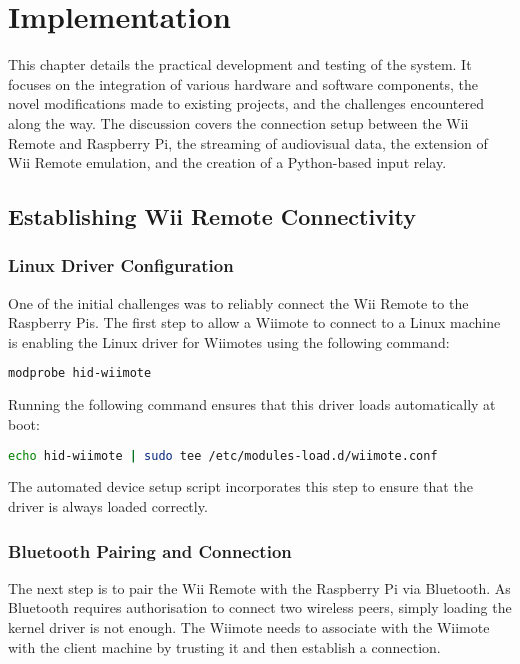 \chapter{Implementation}
\label{chapter:implemntation}

This chapter details the practical development and testing of the system. It
focuses on the integration of various hardware and software components, the
novel modifications made to existing projects, and the challenges encountered
along the way. The discussion covers the connection setup between the Wii Remote
and Raspberry Pi, the streaming of audiovisual data, the extension of Wii Remote
emulation, and the creation of a Python-based input relay.

\section{Establishing Wii Remote Connectivity}
\subsection{Linux Driver Configuration}

One of the initial challenges was to reliably connect the Wii Remote to the
Raspberry Pis. The first step to allow a Wiimote to connect to a Linux machine
is enabling the Linux driver for Wiimotes using the following command:

\begin{lstlisting}[language=bash, emph={modprobe}, emphstyle={\color{magenta}}]
modprobe hid-wiimote
\end{lstlisting}

Running the following command ensures that this driver loads automatically at boot:

\begin{lstlisting}[language=bash]
echo hid-wiimote | sudo tee /etc/modules-load.d/wiimote.conf
\end{lstlisting}

The automated device setup script incorporates this step to ensure that the driver is always loaded correctly.

\subsection{Bluetooth Pairing and Connection}

The next step is to pair the Wii Remote with the Raspberry Pi via Bluetooth. As
Bluetooth requires authorisation to connect two wireless peers, simply loading
the kernel driver is not enough. The Wiimote needs to associate with the Wiimote
with the client machine by trusting it and then establish a connection.


